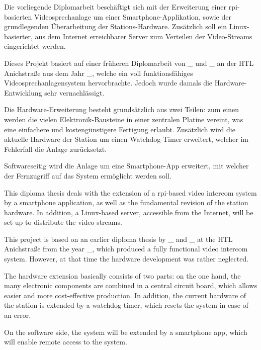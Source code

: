 Die vorliegende Diplomarbeit beschäftigt sich mit der Erweiterung einer \ac{rpi}-basierten Videosprechanlage um einer Smartphone-Applikation, sowie der grundlegenden Überarbeitung der Stations-Hardware.
Zusätzlich soll ein Linux-basierter, aus dem Internet erreichbarer Server zum Verteilen der Video-Streams eingerichtet werden.
\par
Dieses Projekt basiert auf einer früheren Diplomarbeit von \_ und \_ an der HTL Anichstraße aus dem Jahr \_, welche ein voll funktionsfähiges Videosprechanlagensystem hervorbrachte.
Jedoch wurde damals die Hardware-Entwicklung sehr vernachlässigt.
\par
Die Hardware-Erweiterung besteht grundsätzlich aus zwei Teilen: zum einen werden die vielen Elektronik-Bausteine in einer zentralen Platine vereint, was eine einfachere und kostengünstigere Fertigung erlaubt.
Zusätzlich wird die aktuelle Hardware der Station um einen Watchdog-Timer erweitert, welcher im Fehlerfall die Anlage zurücksetzt.
\par
Softwareseitig wird die Anlage um eine Smartphone-App erweitert, mit welcher der Fernzugriff auf das System ermöglicht werden soll.
\par

\vspace*{1cm}
\begin{otherlanguage}{british}
	This diploma thesis deals with the extension of a \ac{rpi}-based video intercom system by a smartphone application, as well as the fundamental revision of the station hardware.
	In addition, a Linux-based server, accessible from the Internet, will be set up to distribute the video streams.
	\par
	This project is based on an earlier diploma thesis by \_ and \_ at the HTL Anichstraße from the year \_, which produced a fully functional video intercom system.
	However, at that time the hardware development was rather neglected.
	\par
	The hardware extension basically consists of two parts: on the one hand, the many electronic components are combined in a central circuit board, which allows easier and more cost-effective production.
	In addition, the current hardware of the station is extended by a watchdog timer, which resets the system in case of an error.
	\par
	On the software side, the system will be extended by a smartphone app, which will enable remote access to the system.
	\par
\end{otherlanguage}